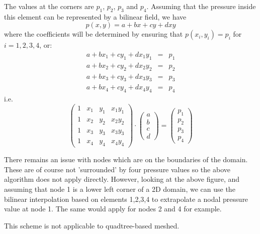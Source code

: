 The values at the corners are $p_1$,
$p_2$, $p_3$ and $p_4$. Assuming that the pressure inside this element can be represented 
by a bilinear field, we have 
\[
p(x,y)= a+ bx +cy +dxy
\]
where the coefficients will be determined by ensuring that $p(x_i,y_i)=p_i$ for $i=1,2,3,4$, or:
\begin{eqnarray}
a+bx_1+cy_1+dx_1y_1 &=& p_1 \\
a+bx_2+cy_2+dx_2y_2 &=& p_2 \\
a+bx_3+cy_3+dx_3y_3 &=& p_3 \\
a+bx_4+cy_4+dx_4y_4 &=& p_4 
\end{eqnarray}
i.e.
\[
\left(
\begin{array}{cccc}
1 & x_1 & y_1 & x_1y_1 \\
1 & x_2 & y_2 & x_2y_2 \\
1 & x_3 & y_3 & x_3y_3 \\
1 & x_4 & y_4 & x_4y_4
\end{array}
\right)\cdot
\left(
\begin{array}{c}
a \\b\\c\\d
\end{array}
\right)
=
\left(
\begin{array}{c}
p_1\\p_2\\p_3\\p_4
\end{array}
\right)
\]

There remains an issue with nodes which are on the boundaries of the domain. These are of course not 
'surrounded' by four pressure values so the above algorithm does not apply directly. However, looking 
at the above figure, and assuming that node 1 is a lower left corner of a 2D domain, we can use the 
bilinear interpolation based on elements 1,2,3,4 to extrapolate a nodal pressure value at node 1. 
The same would apply for nodes 2 and 4 for example. 

\begin{remark}
This scheme is not applicable to quadtree-based meshed.
\end{remark}





